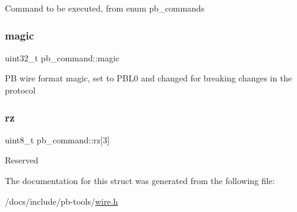 Command to be executed, from enum pb\+\_\+commands \mbox{\label{structpb__command_a30bf4a04fc414f789f9c9bb6eb3170c3}} 
\subsubsection{\texorpdfstring{magic}{magic}}
{\footnotesize\ttfamily uint32\+\_\+t pb\+\_\+command\+::magic}

PB wire format magic, set to \textquotesingle{}P\+B\+L0\textquotesingle{} and changed for breaking changes in the protocol \mbox{\label{structpb__command_abaf981ef1685501792ec2510789d0269}} 
\subsubsection{\texorpdfstring{rz}{rz}}
{\footnotesize\ttfamily uint8\+\_\+t pb\+\_\+command\+::rz\mbox{[}3\mbox{]}}

Reserved 

The documentation for this struct was generated from the following file\+:\begin{DoxyCompactItemize}
\item 
/docs/include/pb-\/tools/\hyperlink{wire_8h}{wire.\+h}\end{DoxyCompactItemize}
